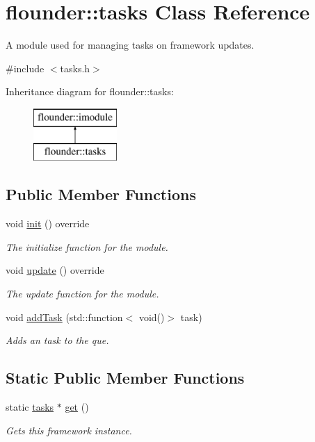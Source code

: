 \hypertarget{classflounder_1_1tasks}{}\section{flounder\+:\+:tasks Class Reference}
\label{classflounder_1_1tasks}


A module used for managing tasks on framework updates.  




{\ttfamily \#include $<$tasks.\+h$>$}

Inheritance diagram for flounder\+:\+:tasks\+:\begin{figure}[H]
\begin{center}
\leavevmode
\includegraphics[height=2.000000cm]{classflounder_1_1tasks}
\end{center}
\end{figure}
\subsection*{Public Member Functions}
\begin{DoxyCompactItemize}
\item 
void \hyperlink{classflounder_1_1tasks_a1527c16072936c764b990d3b9fd8786e}{init} () override
\begin{DoxyCompactList}\small\item\em The initialize function for the module. \end{DoxyCompactList}\item 
void \hyperlink{classflounder_1_1tasks_a32e51c65b63e8c98097d5d40c1912e5c}{update} () override
\begin{DoxyCompactList}\small\item\em The update function for the module. \end{DoxyCompactList}\item 
void \hyperlink{classflounder_1_1tasks_a4c162853b207b90c2686ce0eb9dc9265}{add\+Task} (std\+::function$<$ void()$>$ task)
\begin{DoxyCompactList}\small\item\em Adds an task to the que. \end{DoxyCompactList}\end{DoxyCompactItemize}
\subsection*{Static Public Member Functions}
\begin{DoxyCompactItemize}
\item 
static \hyperlink{classflounder_1_1tasks}{tasks} $\ast$ \hyperlink{classflounder_1_1tasks_a24877315f9d4a52671f5d62ea40d83ec}{get} ()
\begin{DoxyCompactList}\small\item\em Gets this framework instance. \end{DoxyCompactList}\end{DoxyCompactItemize}
